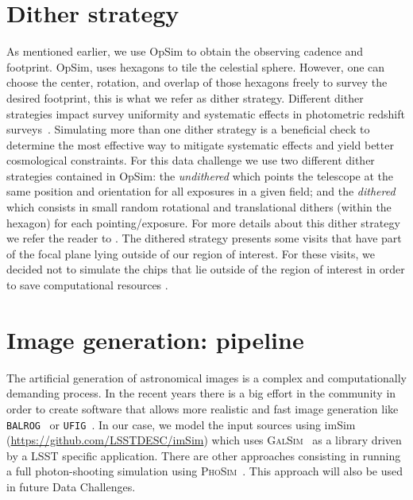 \documentclass[\docopts]{\docclass}
\begin{document}
\section{Dither strategy}
\label{sec:dithering}

As mentioned earlier, we use OpSim to obtain the observing cadence and footprint. OpSim, uses hexagons to tile the celestial sphere. However, one can choose the center, rotation, and overlap of those hexagons freely to survey the desired footprint, this is what we refer as dither strategy. Different dither strategies impact survey uniformity and systematic effects in photometric redshift surveys~\citep{2016ApJ...829...50A}. Simulating more than one dither strategy is a beneficial check to determine the most effective way to mitigate systematic effects and yield better cosmological constraints. For this data challenge we use two different dither strategies contained in OpSim: the \textit{undithered} which points the telescope at the same position and orientation for all exposures in a given field; and the \textit{dithered} which consists in small random rotational and translational dithers (within the hexagon) for each pointing/exposure. For more details about this dither strategy we refer the reader to \citet{2016ApJ...829...50A}. The dithered strategy presents some visits that have part of the focal plane lying outside of our region of interest. For these visits, we decided not to simulate the chips that lie outside of the region of interest in order to save computational resources
.
\section{Image generation: pipeline}
\label{sec:image_generation_pipeline}

The artificial generation of astronomical images is a complex and computationally demanding process. In the recent
years there is a big effort in the community in order to create software that allows more realistic and fast image
generation like \texttt{BALROG}~\citep{2016MNRAS.457..786S} or \texttt{UFIG}~\citep{2016ApJ...817...25B}. In our case, we model the input sources using imSim (\url{https://github.com/LSSTDESC/imSim}) which uses \textsc{GalSim}~\citep{2015A&C....10..121R} as a library driven
by a LSST specific application. There are other approaches consisting in
running a full photon-shooting simulation using \textsc{PhoSim}~\citep{2015ApJS..218...14P}. This approach will also be used in future Data Challenges.
\end{document}
